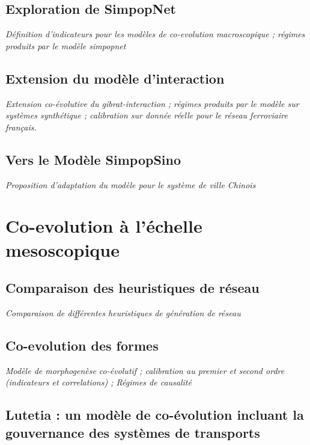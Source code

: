 \subsection{Exploration de SimpopNet}

\textit{Définition d'indicateurs pour les modèles de co-evolution macroscopique ; régimes produits par le modèle simpopnet}

\subsection{Extension du modèle d'interaction}


\textit{Extension co-évolutive du gibrat-interaction ; régimes produits par le modèle sur systèmes synthétique ; calibration sur donnée réelle pour le réseau ferroviaire français.}


\subsection{Vers le Modèle SimpopSino}

\textit{Proposition d'adaptation du modèle pour le système de ville Chinois}





\section{Co-evolution à l'échelle mesoscopique}


\subsection{Comparaison des heuristiques de réseau}

\textit{Comparaison de différentes heuristiques de génération de réseau}


\subsection{Co-evolution des formes}

\textit{Modèle de morphogenèse co-évolutif ; calibration au premier et second ordre (indicateurs et correlations) ; Régimes de causalité}



\subsection{Lutetia : un modèle de co-évolution incluant la gouvernance des systèmes de transports}

